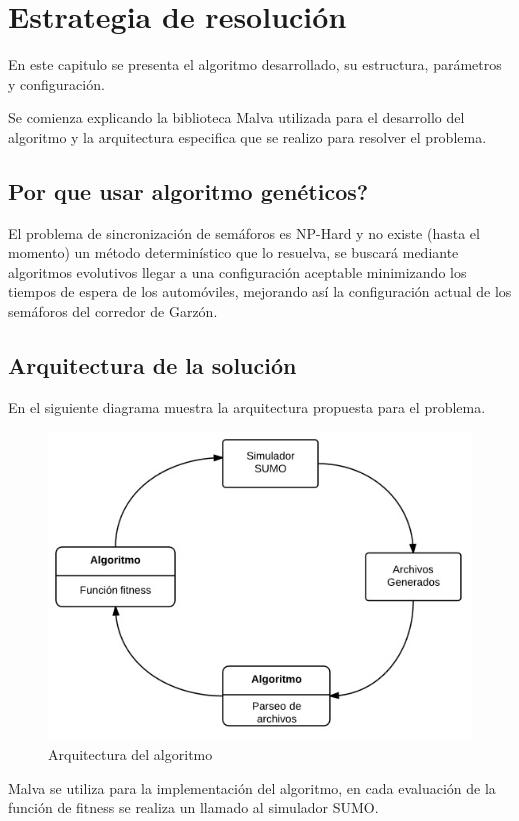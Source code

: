 \chapter{Estrategia de resolución}

En este capitulo se presenta el algoritmo desarrollado, su estructura, parámetros y configuración. 

Se comienza explicando la biblioteca Malva utilizada para el desarrollo del algoritmo y la arquitectura especifica que se realizo para resolver el problema.

\section{Por que usar algoritmo genéticos?}
El problema de sincronización de semáforos es NP-Hard y 
no existe (hasta el momento) un método determinístico que lo
resuelva, se buscará mediante algoritmos evolutivos llegar a
una configuración aceptable minimizando los tiempos de
espera de los automóviles, mejorando así la configuración
actual de los semáforos del corredor de Garzón.


\section{Arquitectura de la solución}

En el siguiente diagrama muestra la arquitectura propuesta para el problema.

\begin{figure}[H]
\centering
\includegraphics[width=0.7\linewidth]{Figures/arquitectura1}
\caption{Arquitectura del algoritmo}
\label{fig:arquitectura1}
\end{figure}


Malva se utiliza para la implementación del algoritmo, en cada evaluación de la función de fitness se realiza un llamado al simulador SUMO. 

